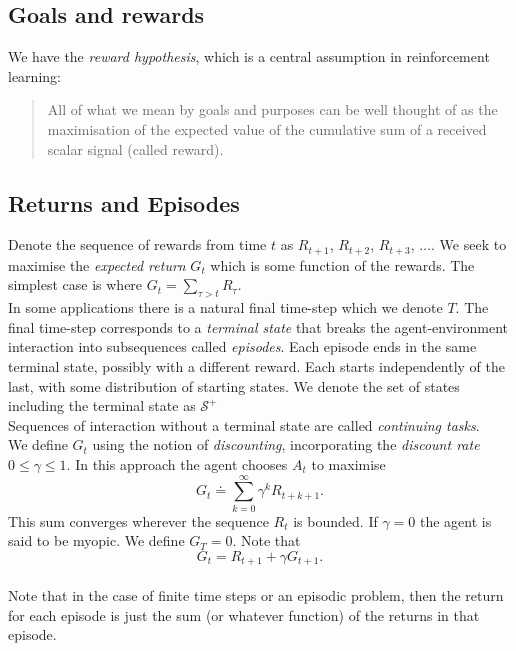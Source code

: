 \documentclass[a4paper, oneside, 11pt]{article}
\begin{document}
\subsection{Goals and rewards}
We have the \emph{reward hypothesis}, which is a central assumption in reinforcement learning:
\begin{quote}
    All of what we mean by goals and purposes can be well thought of as the maximisation of the expected value of the cumulative sum of a received scalar signal (called reward).
\end{quote}


\subsection{Returns and Episodes}
Denote the sequence of rewards from time $t$ as $R_{t+1}$, $R_{t+2}$, $R_{t+3}$, $\dots$. We seek to maximise the \emph{expected return} $G_t$ which is some function of the rewards. The simplest case is where $G_t = \sum_{\tau > t} R_\tau$.\\

In some applications there is a natural final time-step which we denote $T$. The final time-step corresponds to a \emph{terminal state} that breaks the agent-environment interaction into subsequences called \emph{episodes}. Each episode ends in the same terminal state, possibly with a different reward. Each starts independently of the last, with some distribution of starting states. We denote the set of states including the terminal state as $\mathcal{S}^+$\\

Sequences of interaction without a terminal state are called \emph{continuing tasks}. \\

We define $G_t$ using the notion of \emph{discounting}, incorporating the \emph{discount rate} $0 \leq \gamma \leq 1$. In this approach the agent chooses $A_t$ to maximise 
\begin{equation}
    G_t \doteq \sum_{k = 0}^{\infty} \gamma^k R_{t+k+1}.
\end{equation}
 This sum converges wherever the sequence $R_t$ is bounded. If $\gamma = 0$ the agent is said to be myopic. We define $G_T = 0$. Note that
\begin{equation}
     G_t = R_{t+1} + \gamma G_{t+1}.
\end{equation}\\

Note that in the case of finite time steps or an episodic problem, then the return for each episode is just the sum (or whatever function) of the returns in that episode.
\end{document}
